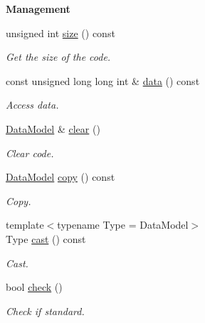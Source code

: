 \begin{Indent}{\bf Management}\par
\begin{DoxyCompactItemize}
\item 
unsigned int \hyperlink{exceptionmagrathea_1_1DataModel_a41f5039949948165f96ffb81d5cdc65d}{size} () const 
\begin{DoxyCompactList}\small\item\em Get the size of the code. \end{DoxyCompactList}\item 
const unsigned long long int \& \hyperlink{exceptionmagrathea_1_1DataModel_acfe055f888655546b9bc7e876a01b5d8}{data} () const 
\begin{DoxyCompactList}\small\item\em Access data. \end{DoxyCompactList}\item 
\hyperlink{exceptionmagrathea_1_1DataModel}{Data\-Model} \& \hyperlink{exceptionmagrathea_1_1DataModel_aaa411894243b0fca04e1f6439498bbc6}{clear} ()
\begin{DoxyCompactList}\small\item\em Clear code. \end{DoxyCompactList}\item 
\hyperlink{exceptionmagrathea_1_1DataModel}{Data\-Model} \hyperlink{exceptionmagrathea_1_1DataModel_a43e322632113d3899e4d206781e8e8c9}{copy} () const 
\begin{DoxyCompactList}\small\item\em Copy. \end{DoxyCompactList}\item 
{\footnotesize template$<$typename Type  = Data\-Model$>$ }\\Type \hyperlink{exceptionmagrathea_1_1DataModel_a7caed4e9f904de1305501774544b89fd}{cast} () const 
\begin{DoxyCompactList}\small\item\em Cast. \end{DoxyCompactList}\item 
bool \hyperlink{exceptionmagrathea_1_1DataModel_a0742b7941dd3fef82eaaabf27b99844b}{check} ()
\begin{DoxyCompactList}\small\item\em Check if standard. \end{DoxyCompactList}\end{DoxyCompactItemize}
\end{Indent}
